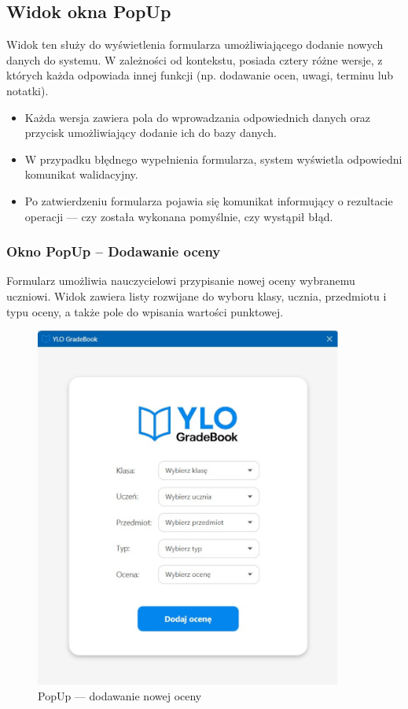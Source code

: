 \subsection{Widok okna PopUp}
Widok ten służy do wyświetlenia formularza umożliwiającego dodanie nowych danych do systemu.
W zależności od kontekstu, posiada cztery różne wersje, z których każda odpowiada innej funkcji (np. dodawanie ocen, uwagi, terminu lub notatki).
\begin{itemize}
    \item Każda wersja zawiera pola do wprowadzania odpowiednich danych oraz przycisk umożliwiający dodanie ich do bazy danych.
    \item W przypadku błędnego wypełnienia formularza, system wyświetla odpowiedni komunikat walidacyjny.
    \item Po zatwierdzeniu formularza pojawia się komunikat informujący o rezultacie operacji — czy została wykonana pomyślnie, czy wystąpił błąd.
\end{itemize}
\clearpage

\subsubsection{Okno PopUp – Dodawanie oceny}

Formularz umożliwia nauczycielowi przypisanie nowej oceny wybranemu uczniowi. Widok zawiera listy rozwijane do wyboru klasy, ucznia, przedmiotu i typu oceny, a także pole do wpisania wartości punktowej.

\begin{figure}[H]
    \centering
    \includegraphics[width=0.9\textwidth]{figures/fig_0016.eps}
    \caption{PopUp — dodawanie nowej oceny}
    \label{fig:popUpGrade}
\end{figure}
\newpage
